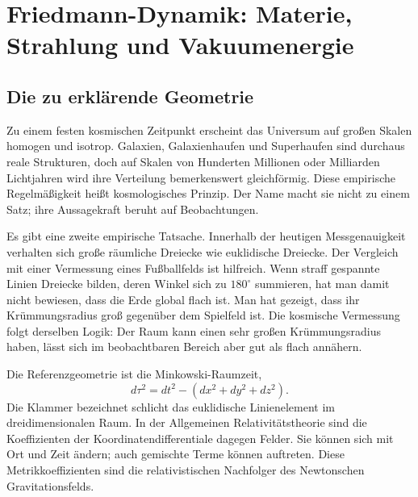 \chapter{Friedmann-Dynamik: Materie, Strahlung und Vakuumenergie}


\section{Die zu erklärende Geometrie}

Zu einem festen kosmischen Zeitpunkt erscheint das Universum auf großen Skalen homogen und isotrop. Galaxien, Galaxienhaufen und Superhaufen sind durchaus reale Strukturen, doch auf Skalen von Hunderten Millionen oder Milliarden Lichtjahren wird ihre Verteilung bemerkenswert gleichförmig. Diese empirische Regelmäßigkeit heißt kosmologisches Prinzip. Der Name macht sie nicht zu einem Satz; ihre Aussagekraft beruht auf Beobachtungen.

Es gibt eine zweite empirische Tatsache. Innerhalb der heutigen Messgenauigkeit verhalten sich große räumliche Dreiecke wie euklidische Dreiecke. Der Vergleich mit einer Vermessung eines Fußballfelds ist hilfreich. Wenn straff gespannte Linien Dreiecke bilden, deren Winkel sich zu \(180^\circ\) summieren, hat man damit nicht bewiesen, dass die Erde global flach ist. Man hat gezeigt, dass ihr Krümmungsradius groß gegenüber dem Spielfeld ist. Die kosmische Vermessung folgt derselben Logik: Der Raum kann einen sehr großen Krümmungsradius haben, lässt sich im beobachtbaren Bereich aber gut als flach annähern.

Die Referenzgeometrie ist die Minkowski-Raumzeit,
\begin{equation}
  d\tau^2=dt^2-\left(dx^2+dy^2+dz^2\right).
  \label{eq:l09-minkowski}
\end{equation}
Die Klammer bezeichnet schlicht das euklidische Linienelement im dreidimensionalen Raum. In der Allgemeinen Relativitätstheorie sind die Koeffizienten der Koordinatendifferentiale dagegen Felder. Sie können sich mit Ort und Zeit ändern; auch gemischte Terme können auftreten. Diese Metrikkoeffizienten sind die relativistischen Nachfolger des Newtonschen Gravitationsfelds.

